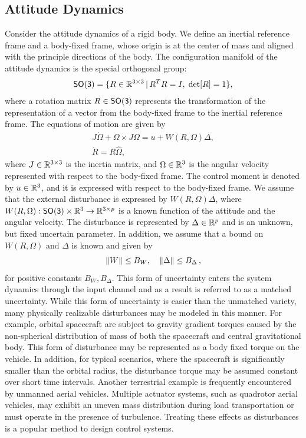 \documentclass[fleqn]{IJCAS}  %
\begin{document}
\begin{multicols}{2}
\subsection{Attitude Dynamics}\label{sec:att_dyn}
Consider the attitude dynamics of a rigid body.
We define an inertial reference frame and a body-fixed frame, whose origin is at the center of mass and aligned with the principle directions of the body. 
The configuration manifold of the attitude dynamics is the special orthogonal group:
\begin{align*}
	\mathsf{SO(3)} = \{R\in\mathbb{R}^{3\times 3}\,|\, R^TR=I,\;\mathrm{det}[R]=1\} ,
\end{align*}
where a rotation matrix $R\in\mathsf{SO(3)}$ represents the transformation of the representation of a vector from the body-fixed frame to the inertial reference frame. 
The equations of motion are given by
\begin{gather}
	J\dot\Omega + \Omega\times J\Omega = u+W(R,\Omega)\Delta ,\label{eqn:Wdot}\\
	\dot R = R\hat\Omega ,\label{eqn:Rdot}
\end{gather}
where $J\in\mathbb{R}^{3\times 3}$ is the inertia matrix, and $\Omega\in\mathbb{R}^{3}$ is the angular velocity represented with respect to the body-fixed frame. 
The control moment is denoted by $u\in\mathbb{R}^{3}$, and it is expressed with respect to the body-fixed frame. 
We assume that the external disturbance is expressed by $W(R,\Omega)\Delta$, where $W(R,\Omega):\mathsf{SO(3)}\times\mathbb{R}^{3}\rightarrow \mathbb{R}^{3\times p}$ is a known function of the attitude and the angular velocity.
The disturbance is represented by $\Delta\in\mathbb{R}^{p}$ and is an unknown, but fixed uncertain parameter.
In addition, we assume that a bound on \( W(R, \Omega) \text{ and } \Delta \) is known and given by
\begin{equation}
	\left\| W \right\| \leq B_W , \quad \left\| \Delta \right\| \leq B_\Delta \,, \label{eqn:W_bound}
\end{equation}
for positive constants \( B_W, B_\Delta\).
This form of uncertainty enters the system dynamics through the input channel and as a result is referred to as a matched uncertainty. 
While this form of uncertainty is easier than the unmatched variety, many physically realizable disturbances may be modeled in this manner.
For example, orbital spacecraft are subject to gravity gradient torques caused by the non-spherical distribution of mass of both the spacecraft and central gravitational body.
This form of disturbance may be represented as a body fixed torque on the vehicle.
In addition, for typical scenarios, where the spacecraft is significantly smaller than the orbital radius, the disturbance torque may be assumed constant over short time intervals.
Another terrestrial example is frequently encountered by unmanned aerial vehicles. 
Multiple actuator systems, such as quadrotor aerial vehicles, may exhibit an uneven mass distribution during load transportation or must operate in the presence of turbulence. 
Treating these effects as disturbances is a popular method to design control systems.


\end{multicols}
\end{document}
